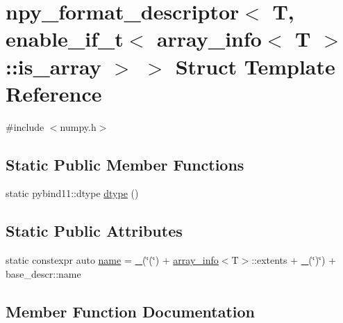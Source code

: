 \hypertarget{structnpy__format__descriptor_3_01_t_00_01enable__if__t_3_01array__info_3_01_t_01_4_1_1is__array_01_4_01_4}{}\section{npy\+\_\+format\+\_\+descriptor$<$ T, enable\+\_\+if\+\_\+t$<$ array\+\_\+info$<$ T $>$\+::is\+\_\+array $>$ $>$ Struct Template Reference}
\label{structnpy__format__descriptor_3_01_t_00_01enable__if__t_3_01array__info_3_01_t_01_4_1_1is__array_01_4_01_4}


{\ttfamily \#include $<$numpy.\+h$>$}

\subsection*{Static Public Member Functions}
\begin{DoxyCompactItemize}
\item 
static pybind11\+::dtype \mbox{\hyperlink{structnpy__format__descriptor_3_01_t_00_01enable__if__t_3_01array__info_3_01_t_01_4_1_1is__array_01_4_01_4_aa115eb62d76563508a93790d6a8fb6e4}{dtype}} ()
\end{DoxyCompactItemize}
\subsection*{Static Public Attributes}
\begin{DoxyCompactItemize}
\item 
static constexpr auto \mbox{\hyperlink{structnpy__format__descriptor_3_01_t_00_01enable__if__t_3_01array__info_3_01_t_01_4_1_1is__array_01_4_01_4_a82a11b4256cedcd73d222c0e7318abe4}{name}} = \mbox{\hyperlink{descr_8h_af114703e20c6527e87163eb2798f74b8}{\+\_\+}}(\char`\"{}(\char`\"{}) + \mbox{\hyperlink{structarray__info}{array\+\_\+info}}$<$T$>$\+::extents + \mbox{\hyperlink{descr_8h_af114703e20c6527e87163eb2798f74b8}{\+\_\+}}(\char`\"{})\char`\"{}) + base\+\_\+descr\+::name
\end{DoxyCompactItemize}


\subsection{Member Function Documentation}
\mbox{\label{structnpy__format__descriptor_3_01_t_00_01enable__if__t_3_01array__info_3_01_t_01_4_1_1is__array_01_4_01_4_aa115eb62d76563508a93790d6a8fb6e4}} 
